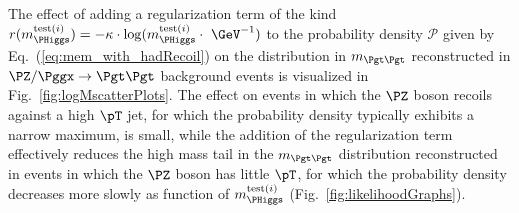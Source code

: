 The effect of adding a regularization term of the kind 
$r(m_{\PHiggs}^{\textrm{test}(i)}) = -\kappa \cdot \log(m_{\PHiggs}^{\textrm{test}(i)} \cdot \mbox{~\GeV}^{-1})$ 
to the probability density $\mathcal{P}$ given by Eq.~(\ref{eq:mem_with_hadRecoil})
on the distribution in $m_{\Pgt\Pgt}$ reconstructed in $\PZ/\Pggx \to \Pgt\Pgt$ background events
is visualized in Fig.~\ref{fig:logMscatterPlots}.
The effect on events in which the $\PZ$ boson recoils against a high $\pT$ jet, for which the probability density typically exhibits a narrow maximum, is small, 
while the addition of the regularization term effectively reduces the high mass tail in the $m_{\Pgt\Pgt}$ distribution reconstructed in
events in which the $\PZ$ boson has little $\pT$,
for which the probability density decreases more slowly as function of $m_{\PHiggs}^{\textrm{test}(i)}$ (\cf Fig.~\ref{fig:likelihoodGraphs}).

